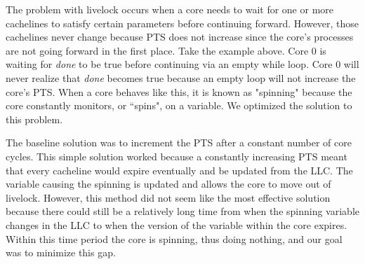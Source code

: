 \documentclass[12pt]{article}
\begin{document}
The problem with livelock occurs when a core needs to wait for one or 
more cachelines to satisfy certain parameters before continuing 
forward. However, those cachelines never change because PTS does not 
increase since the core’s processes are not going forward in the first 
place. Take  the example above. Core 0 is waiting for \textit{done} to 
be true before continuing via an empty while loop. Core 0 will never 
realize that \textit{done} becomes true because an empty loop will not increase 
the core's PTS. When a core behaves like this, it is known as 
"spinning" because the core constantly monitors, or ``spins", on a 
variable. We optimized the solution to this problem. 

The baseline solution was to increment the PTS after a constant number 
of core cycles. This simple solution worked because a constantly 
increasing PTS meant that every cacheline would expire eventually and 
be updated from the LLC. The variable causing the spinning is updated 
and allows the core to move out of livelock. However, this method did 
not seem like the most effective solution because there could still be 
a relatively long time from when the spinning variable changes in the 
LLC to when the version of the variable within the core expires.  
Within this time period the core is spinning, thus doing nothing, and 
our goal was to minimize this gap. 
	

	
\end{document}
